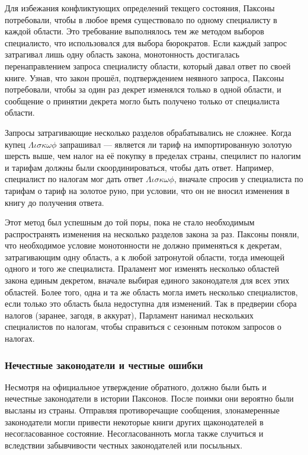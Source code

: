 \documentclass[12pt, a4paper]{article} %
\begin{document}
Для избежания конфликтующих определений текщего состояния, Паксоны потребовали, чтобы в любое время существовало по одному специалисту в каждой области. Это требование выполнялось тем же методом выборов специалисто, что использовался для выбора бюрократов. Если каждый запрос затрагивал лишь одну область закона, монотонность достигалась перенаправлением запроса специалисту области, который давал ответ по своей книге. Узнав, что закон прошёл, подтверждением неявного запроса, Паксоны потребовали, чтобы за один раз декрет изменялся только в одной области, и сообщение о принятии декрета могло быть получено только от специалиста области.

Запросы затрагивающие несколько разделов обрабатывались не сложнее. Когда купец $\Lambda\iota\sigma\kappa\omega\phi$ запрашивал --- является ли тариф на импортированную золотую шерсть выше, чем налог на её покупку в пределах страны, специлист по налогим и тарифам должны были скоординироваться, чтобы дать ответ. Например, специалист по налогам мог дать ответ $\Lambda\iota\sigma\kappa\omega\phi$, вначале спросив у специалиста по тарифам о тариф на золотое руно, при условии, что он не вносил изменения в книгу до получения ответа.

Этот метод был успешным до той поры, пока не стало необходимым распространять изменения на несколько разделов закона за раз. Паксоны поняли, что необходимое условие монотонности не должно применяться к декретам, затрагивающим одну область, а к любой затронутой области, тогда имеющей одного и того же специалиста. Праламент мог изменять несколько областей закона единым декретом, вначале выбирая единого законодателя для всех этих областей. Более того, одна и та же область могла иметь несколько специалистов, если только это область была недоступна для изменений. Так в предверии сбора налогов (заранее, загодя, в аккурат), Парламент нанимал нескольких специалистов по налогам, чтобы справиться с сезонным потоком запросов о налогах.

\subsubsection{Нечестные законодатели и честные ошибки}

Несмотря на официальное утверждение обратного, должно были быть и нечестные законодатели в истории Паксонов. После поимки они вероятно были высланы из страны. Отправляя противоречащие сообщения, злонамеренные законодатели могли привести некоторые книги других щаконодателей в несогласованное состояние. Несогласованноть могла также случиться и вследствии забывчивости честных законодателей или посыльных.
\end{document}
